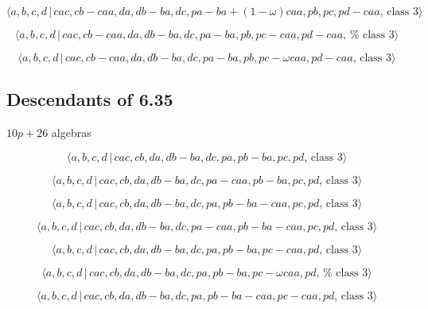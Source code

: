\documentclass[10pt]{article}
\begin{document}
\begin{equation}
\langle a,b,c,d\,|\,cac,cb-caa,da,db-ba,dc,pa-ba+(1-\omega
)caa,pb,pc,pd-caa,\,\text{class }3\rangle  \tag{7.4176}
\end{equation}

\begin{equation}
\langle a,b,c,d\,|\,cac,cb-caa,da,db-ba,dc,pa-ba,pb,pc-caa,pd-caa,\,\text{%
class }3\rangle  \tag{7.4177}
\end{equation}

\begin{equation}
\langle a,b,c,d\,|\,cac,cb-caa,da,db-ba,dc,pa-ba,pb,pc-\omega caa,pd-caa,\,%
\text{class }3\rangle  \tag{7.4178}
\end{equation}

\subsection{Descendants of 6.35}

$10p+26$ algebras

\begin{equation}
\langle a,b,c,d\,|\,cac,cb,da,db-ba,dc,pa,pb-ba,pc,pd,\,\text{class }3\rangle
\tag{7.4179}
\end{equation}

\begin{equation}
\langle a,b,c,d\,|\,cac,cb,da,db-ba,dc,pa-caa,pb-ba,pc,pd,\,\text{class }%
3\rangle  \tag{7.4180}
\end{equation}

\begin{equation}
\langle a,b,c,d\,|\,cac,cb,da,db-ba,dc,pa,pb-ba-caa,pc,pd,\,\text{class }%
3\rangle  \tag{7.4181}
\end{equation}

\begin{equation}
\langle a,b,c,d\,|\,cac,cb,da,db-ba,dc,pa-caa,pb-ba-caa,pc,pd,\,\text{class }%
3\rangle  \tag{7.4182}
\end{equation}

\begin{equation}
\langle a,b,c,d\,|\,cac,cb,da,db-ba,dc,pa,pb-ba,pc-caa,pd,\,\text{class }%
3\rangle  \tag{7.4183}
\end{equation}

\begin{equation}
\langle a,b,c,d\,|\,cac,cb,da,db-ba,dc,pa,pb-ba,pc-\omega caa,pd,\,\text{%
class }3\rangle  \tag{7.4184}
\end{equation}

\begin{equation}
\langle a,b,c,d\,|\,cac,cb,da,db-ba,dc,pa,pb-ba-caa,pc-caa,pd,\,\text{class }%
3\rangle  \tag{7.4185}
\end{equation}
\end{document}
